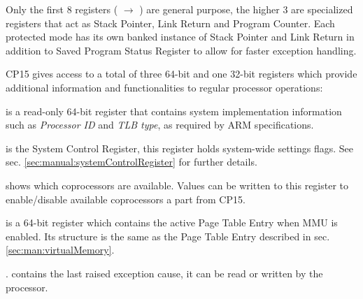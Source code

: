 Only the first 8 registers ( $\rightarrow$ ) are general purpose, the higher 3 are specialized registers that act as Stack Pointer, Link Return and Program Counter. Each protected mode has its own banked instance of Stack Pointer and Link Return in addition to Saved Program Status Register to allow for faster exception handling. 

\vspace{5px}
\begin{adjustbox}{center}

\end{adjustbox}
\vspace{5px}


CP15 gives access to a total of three 64-bit and one 32-bit registers which provide additional information and functionalities to regular processor operations:

 is a read-only 64-bit register that contains system implementation information such as \emph{Processor ID} and \emph{TLB type}, as required by ARM specifications.

 is the System Control Register, this register holds system-wide settings flags.
See sec. \ref{sec:manual:systemControlRegister} for further details.

 shows which coprocessors are available. Values can be written to this register to enable/disable available coprocessors a part from CP15.

\vspace{5px}
\begin{adjustbox}{center}

\end{adjustbox}
\vspace{5px}

 is a 64-bit register which contains the active Page Table Entry when MMU is enabled. Its structure is the same as the Page Table Entry described in sec. \ref{sec:man:virtualMemory}.

. contains the last raised exception cause, it can be read or written by the processor.

